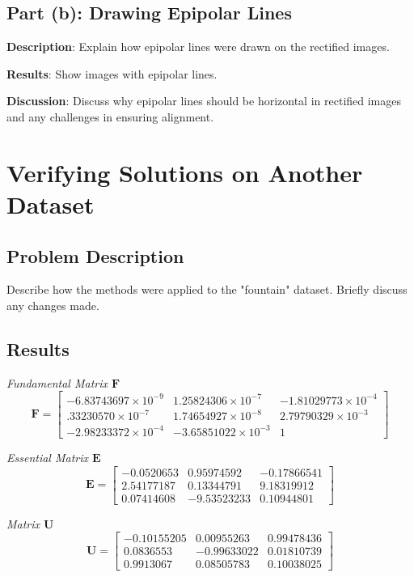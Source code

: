\documentclass{article}
\begin{document}
\subsection{Part (b): Drawing Epipolar Lines}
\textbf{Description}: Explain how epipolar lines were drawn on the rectified images.

\textbf{Results}: Show images with epipolar lines.


\textbf{Discussion}: Discuss why epipolar lines should be horizontal in rectified images and any challenges in ensuring alignment.

\section{Verifying Solutions on Another Dataset}
\subsection{Problem Description}
Describe how the methods were applied to the "fountain" dataset. Briefly discuss any changes made.

\subsection{Results}

\textit{Fundamental Matrix $\mathbf{F}$}
\[
\mathbf{F} = \begin{bmatrix} 
-6.83743697 \times 10^{-9} & 1.25824306 \times 10^{-7} & -1.81029773 \times 10^{-4} \\ 
.33230570 \times 10^{-7} & 1.74654927 \times 10^{-8} & 2.79790329 \times 10^{-3} \\ 
-2.98233372 \times 10^{-4} & -3.65851022 \times 10^{-3} & 1 
\end{bmatrix}
\]

\textit{Essential Matrix $\mathbf{E}$}
\[
\mathbf{E} = \begin{bmatrix}
-0.0520653 & 0.95974592 & -0.17866541 \\ 
2.54177187 & 0.13344791 & 9.18319912 \\ 
0.07414608 & -9.53523233 & 0.10944801 
\end{bmatrix}
\]

\textit{Matrix $\mathbf{U}$}
\[
\mathbf{U} = \begin{bmatrix}
-0.10155205 & 0.00955263 & 0.99478436 \\ 
0.0836553 & -0.99633022 & 0.01810739 \\ 
0.9913067 & 0.08505783 & 0.10038025 
\end{bmatrix}
\]
\end{document}
